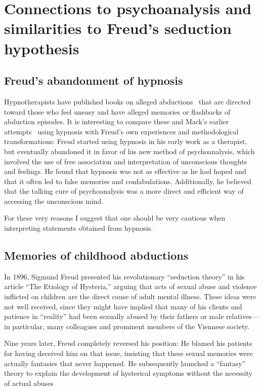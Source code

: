 
\section{Connections to psychoanalysis and similarities to Freud's seduction hypothesis}
\label{2023-UFO-part-Perception-abductions-sfsh}

\subsection{Freud's abandonment of hypnosis}

Hypnotherapists have published books on alleged abductions~\cite{Marden2019Aug,Lalich2020,Smith2008Feb}
that are directed toward those who feel uneasy and have alleged memories or flashbacks of abduction episodes.
It is interesting to compare these and Mack's earlier attempts~\cite{Mack1994Apr,Mack1999PC} using hypnosis
with Freud's own experiences and methodological transformations:
Freud started using hypnosis in his early work as a therapist,
but eventually abandoned it in favor of his new method of psychoanalysis,
which involved the use of free association and interpretation of unconscious thoughts and feelings.
He found that hypnosis was not as effective as he had hoped and that it often led to false memories and confabulations.
Additionally, he believed that the talking cure of psychoanalysis
was a more direct and efficient way of accessing the unconscious mind.

For these very reasons I suggest that one should be very cautious when interpreting statements obtained from hypnosis.


\subsection{Memories of childhood abductions}

In 1896, Sigmund Freud presented his revolutionary ``seduction theory''
in his article ``The Etiology of Hysteria,''
arguing that acts of sexual abuse and violence inflicted on children are the direct cause of adult mental illness.
These ideas were not well received, since they might have implied that many of his clients and patience
in ``reality'' had been sexually abused by their fathers or male relatives---in particular, many   colleagues and prominent members of
the Viennese society.

Nine years later, Freud completely reversed his position:
He blamed his patients for having deceived him on that issue,
insisting that these sexual memories were actually fantasies that never happened.
He subsequently launched a ``fantasy'' theory to explain the development of hysterical
symptoms without the necessity of actual abuses~\cite{Masson1984,Eisen2001Jan,Bogousslavsky_2014}

